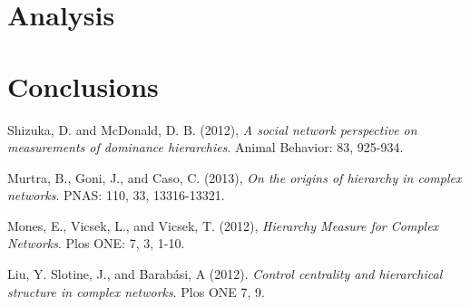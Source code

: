 \documentclass[3p,times]{elsarticle}
\begin{document}
\section{Analysis}


 
\section{Conclusions}







\begin{thebibliography}{9}
	Shizuka, D. and McDonald, D. B. (2012),
	\textit{A social network perspective on measurements of dominance hierarchies}. 
	Animal Behavior: 83, 925-934.
	
	Murtra, B., Goni, J., and Caso, C. (2013),
	\textit{On the origins of hierarchy in complex networks}. 
	PNAS: 110, 33, 13316-13321.

	Mones, E., Vicsek, L., and Vicsek, T. (2012),
	\textit{Hierarchy Measure for Complex Networks}. 
	Plos ONE: 7, 3, 1-10.
	
	Liu, Y. Slotine, J., and Barab{\'a}si, A (2012).
	\textit{Control centrality and hierarchical structure in complex networks}.
	Plos ONE 7, 9.
	
\end{thebibliography}


\end{document}
